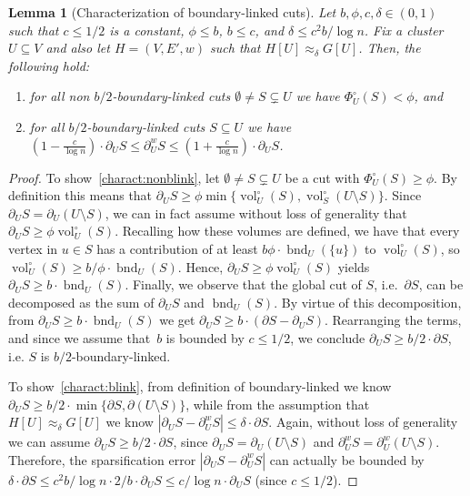 \documentclass[epsfig,letter,11pt]{article}
\numberwithin{equation}{section}
\newcommand{\unbor}[2]{\operatorname{bnd}_{#2} (#1)}
\newcommand{\unvolc}[2]{\operatorname{vol}_{#2}^\circ (#1)}
\newcommand{\unspc}[2]{\Phi_{#2}^\circ (#1)}
\newcommand{\uncut}[2]{{\partial}_{#2} #1}
\newcommand{\uncutg}[1]{{\partial} #1}
\newcommand{\wcut}[2]{\partial^w_{#2} #1}
\newtheorem{lemma}[theorem]{Lemma}
\begin{document}
\begin{lemma}[Characterization of boundary-linked cuts]
	\label{lem:blinkcuts}
	Let $b, \phi, c,\delta \in (0,1)$ such that $c \leq 1/2$ is a constant, $\phi \le b$, $b \le c$, and $\delta \le c^2b/ \log n$.  Fix a cluster $U \subseteq V$ and also let $H=(V,E',w)$ such that $H[U] \approx_\delta G[U]$. Then, the following hold:
	\begin{enumerate}
		\item \label{charact:nonblink} for all non $b/2$-boundary-linked cuts $\emptyset \neq S \subsetneq U$ we have $\unspc{S}{U} < \phi$, and
		\item \label{charact:blink} for all $b/2$-boundary-linked cuts $S \subseteq U$ we have $(1-\frac{c}{\log n})\cdot \uncut{S}{U} \le \wcut{S}{U} \le 	(1+\frac{c}{\log n})\cdot \uncut{S}{U}$.
	\end{enumerate}
\end{lemma}
\begin{proof}
	To show~\eqref{charact:nonblink}, let $\emptyset \neq S \subsetneq U$ be a cut with $\unspc{S}{U} \ge \phi$. By definition this means that $\uncut{S}{U} \ge \phi \min \{\unvolc{S}{U},\unvolc{U \setminus S}{S}\}$. Since $\uncut{S}{U}=\uncut{(U\setminus S)}{U}$, we can in fact assume without loss of generality that $\uncut{S}{U} \ge \phi \unvolc{S}{U}$. Recalling how these volumes are defined, we have that every vertex in $u \in S$ has a contribution of at least $b\phi \cdot \unbor{\{u\}}{U}$ to $\unvolc{S}{U}$, so $\unvolc{S}{U} \ge b/\phi \cdot \unbor{S}{U}$. Hence, $\uncut{S}{U} \ge \phi \unvolc{S}{U}$ yields $\uncut{S}{U} \ge b \cdot \unbor{S}{U}$. Finally, we observe that the global cut of $S$, i.e.~$\uncutg{S}$, can be decomposed as the sum of $\uncut{S}{U}$ and $\unbor{S}{U}$. By virtue of this decomposition, from $\uncut{S}{U} \ge b \cdot \unbor{S}{U}$ we get $\uncut{S}{U} \ge b \cdot (\uncutg{S}-\uncut{S}{U})$. Rearranging the terms, and since we assume that~$b$ is bounded by $c \le 1/2$, we conclude $\uncut{S}{U} \ge b/2 \cdot \uncutg{S}$, i.e. $S$ is $b/2$-boundary-linked.
	
	To show~\eqref{charact:blink}, from definition of boundary-linked we know $\uncut{S}{U} \ge b/2 \cdot \min\{\uncutg{S}, \uncutg{(U \setminus S)}\} $, while from the assumption that $H[U] \approx_\delta G[U]$ we know $|\uncut{S}{U} - \wcut{S}{U} | \le \delta \cdot \uncutg{S}$. Again, without loss of generality we can assume $\uncut{S}{U} \ge b/2 \cdot \uncutg{S}$, since $\uncut{S}{U}=\uncut{(U\setminus S)}{U}$ and $\wcut{S}{U}=\wcut{(U\setminus S)}{U}$. Therefore, the sparsification error $|\uncut{S}{U} - \wcut{S}{U} | $ can actually be bounded by $\delta \cdot \uncutg{S} \le c^2b/ \log n \cdot 2/b \cdot \uncut{S}{U} \le  c/\log n \cdot \uncut{S}{U}$ (since $c\le 1/2$).
\end{proof}
\end{document}
